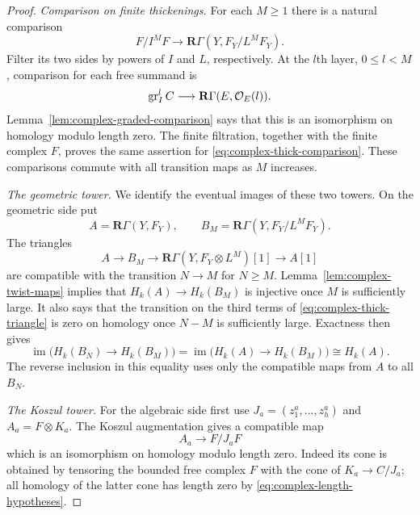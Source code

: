 \begin{proof}
\emph{Comparison on finite thickenings.}
For each $M\geq1$ there is a natural comparison
\begin{equation}\label{eq:complex-thick-comparison}
 F/I^M F\longrightarrow
 \mathbf R\Gamma(Y,F_Y/L^M F_Y).
\end{equation}
Filter its two sides by powers of $I$ and $L$, respectively. At the
$l$th layer, $0\leq l<M$, comparison for each free summand is
\[
 \operatorname{gr}_I^l C\longrightarrow\mathbf R\Gamma(E,\mathcal O_E(l)).
\]
Lemma~\ref{lem:complex-graded-comparison} says that this is an isomorphism
on homology modulo length zero. The finite filtration, together with the
finite complex $F$, proves the same assertion for
\eqref{eq:complex-thick-comparison}. These comparisons commute with all
transition maps as $M$ increases.

\smallskip
\noindent\emph{The geometric tower.}
We identify the eventual images of these two towers. On the geometric
side put
\[
 A=\mathbf R\Gamma(Y,F_Y),\qquad
 B_M=\mathbf R\Gamma(Y,F_Y/L^M F_Y).
\]
The triangles
\begin{equation}\label{eq:complex-thick-triangle}
 A\longrightarrow B_M\longrightarrow
 \mathbf R\Gamma(Y,F_Y\otimes L^M)[1]\longrightarrow A[1]
\end{equation}
are compatible with the transition $N\to M$ for $N\geq M$.
Lemma~\ref{lem:complex-twist-maps} implies that $H_k(A)\to H_k(B_M)$ is
injective once $M$ is sufficiently large. It also says that the transition
on the third terms of \eqref{eq:complex-thick-triangle} is zero on homology
once $N-M$ is sufficiently large. Exactness then gives
\begin{equation}\label{eq:complex-geometric-image}
 \operatorname{im}\bigl(H_k(B_N)\to H_k(B_M)\bigr)
   =\operatorname{im}\bigl(H_k(A)\to H_k(B_M)\bigr)
   \cong H_k(A).
\end{equation}
The reverse inclusion in this equality uses only the compatible maps from
$A$ to all $B_N$.

\smallskip
\noindent\emph{The Koszul tower.}
For the algebraic side first use $J_a=(z_1^a,\ldots,z_h^a)$ and
$A_a=F\otimes K_a$. The Koszul augmentation gives a compatible map
\[
 A_a\longrightarrow F/J_aF
\]
which is an isomorphism on homology modulo length zero. Indeed its cone
is obtained by tensoring the bounded free complex $F$ with the cone of
$K_a\to C/J_a$; all homology of the latter cone has length zero by
\eqref{eq:complex-length-hypotheses}.


\end{proof}
